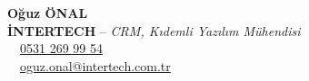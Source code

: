 \documentclass[9pt,a4paper]{article}
\begin{document}
\begin{minipage}[t][\paperheight]{14.1cm}
\begin{minipage}[t]{12.6cm}
        {\fontsize{12}{14}\selectfont\bfseries \color{maintext} Oğuz ÖNAL} \\[0.3ex]
        {\fontsize{11}{13}\selectfont\bfseries\color{accentblue} İNTERTECH} {\fontsize{11}{13}\selectfont\color{lightgray}--} {\fontsize{11}{13}\selectfont\color{accentblue}\textit{CRM, Kıdemli Yazılım Mühendisi}} \\[0.3ex]
        {\normalsize\textcolor{accentblue}{\faPhone*}\ \ \href{tel:05312699954}{\color{maintext}0531 269 99 54}} \\
        {\normalsize\textcolor{accentblue}{\faEnvelope}\ \ \href{mailto:oguz.onal@intertech.com.tr}{\color{maintext}oguz.onal@intertech.com.tr}}

    \end{minipage}
\end{minipage}
\end{document}
